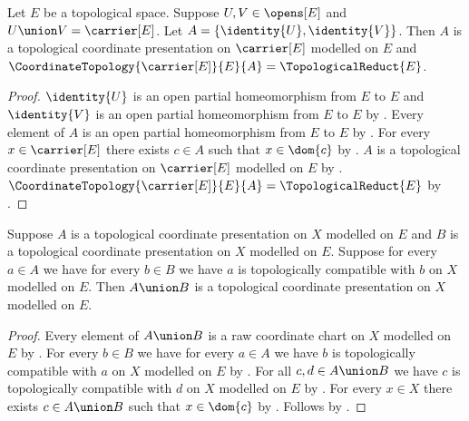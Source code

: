 \begin{theorem}\label{two_open_identity_charts}
    Let $E$ be a topological space.
    Suppose $U,V\in\opens[E]$ and $U\union V=\carrier[E]$.
    Let $A=\{\identity{U},\identity{V}\}$.
    Then $A$ is a topological coordinate presentation on $\carrier[E]$
        modelled on $E$ and
        $\CoordinateTopology{\carrier[E]}{E}{A}=\TopologicalReduct{E}$.
\end{theorem}
\begin{proof}
    $\identity{U}$ is an open partial homeomorphism from $E$ to $E$ and
        $\identity{V}$ is an open partial homeomorphism from $E$ to $E$ by
        .
    Every element of $A$ is an open partial homeomorphism from $E$ to $E$
        by .
    For every $x\in\carrier[E]$ there exists $c\in A$ such that $x\in\dom{c}$
        by .
    $A$ is a topological coordinate presentation on $\carrier[E]$ modelled on $E$
        by .
    $\CoordinateTopology{\carrier[E]}{E}{A}=\TopologicalReduct{E}$ by
        .
\end{proof}

\begin{theorem}\label{cross_compatible_presentation_union}
    Suppose $A$ is a topological coordinate presentation on $X$ modelled on $E$ and
        $B$ is a topological coordinate presentation on $X$ modelled on $E$.
    Suppose for every $a\in A$ we have for every $b\in B$ we have
        $a$ is topologically compatible with $b$ on $X$ modelled on $E$.
    Then $A\union B$ is a topological coordinate presentation on $X$ modelled on $E$.
\end{theorem}
\begin{proof}
    Every element of $A\union B$ is a raw coordinate chart on $X$ modelled on $E$
        by .
    For every $b\in B$ we have for every $a\in A$ we have
        $b$ is topologically compatible with $a$ on $X$ modelled on $E$ by
        .
    For all $c,d\in A\union B$ we have
        $c$ is topologically compatible with $d$ on $X$ modelled on $E$ by
        .
    For every $x\in X$ there exists $c\in A\union B$ such that $x\in\dom{c}$ by
        .
    Follows by .
\end{proof}

